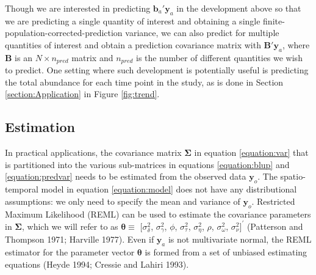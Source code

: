 \documentclass[smallextended]{svjour3}       %
\begin{document}
Though we are interested in predicting \(\mathbf{b}_a ' \mathbf{y}_a\)
in the development above so that we are predicting a single quantity of
interest and obtaining a single finite-population-corrected-prediction
variance, we can also predict for multiple quantities of interest and
obtain a prediction covariance matrix with \(\mathbf{B}' \mathbf{y}_a\),
where \(\mathbf{B}\) is an \(N \times n_{pred}\) matrix and \(n_{pred}\)
is the number of different quantities we wish to predict. One setting
where such development is potentially useful is predicting the total
abundance for each time point in the study, as is done in Section
\ref{section:Application} in Figure \ref{fig:trend}.

\hypertarget{estimation}{%
\subsection{Estimation}\label{estimation}}

In practical applications, the covariance matrix \(\bm{\Sigma}\) in
equation \ref{equation:var} that is partitioned into the various
sub-matrices in equations \ref{equation:blup} and \ref{equation:predvar}
needs to be estimated from the observed data \(\mathbf{y}_o\). The
spatio-temporal model in equation \ref{equation:model} does not have any
distributional assumptions: we only need to specify the mean and
variance of \(\mathbf{y}_o\). Restricted Maximum Likelihood (REML) can
be used to estimate the covariance parameters in \(\bm{\Sigma}\), which
we will refer to as \(\bm{\theta} \equiv\) \([\sigma^2_{\delta}\),
\(\sigma^2_{\gamma}\), \(\phi\), \(\sigma^2_{\tau}\),
\(\sigma^2_{\eta}\), \(\rho\), \(\sigma^2_{\omega}\),
\(\sigma^2_{\nu}]^\prime\) (Patterson and Thompson 1971; Harville 1977).
Even if \(\mathbf{y}_a\) is not multivariate normal, the REML estimator
for the parameter vector \(\bm{\theta}\) is formed from a set of
unbiased estimating equations (Heyde 1994; Cressie and Lahiri 1993).
\end{document}
